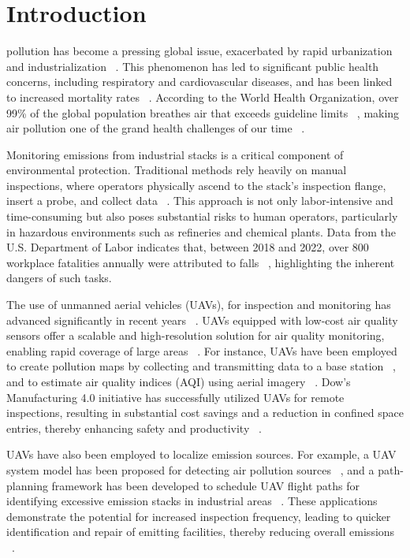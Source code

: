 \documentclass[lettersize,journal]{IEEEtran}
\begin{document}
\section{Introduction} \label{sec.intro}
 pollution has become a pressing global issue, exacerbated by rapid urbanization and industrialization ~\cite{barbera2010hyperbolic}. This phenomenon has led to significant public health concerns, including respiratory and cardiovascular diseases, and has been linked to increased mortality rates ~\cite{zarrar2023drive}. According to the World Health Organization, over 99\% of the global population breathes air that exceeds guideline limits ~\cite{WHO-poluted99}, making air pollution one of the grand health challenges of our time ~\cite{world2016ambient}.

Monitoring emissions from industrial stacks is a critical component of environmental protection. Traditional methods rely heavily on manual inspections, where operators physically ascend to the stack's inspection flange, insert a probe, and collect data ~\cite{testo350application}. This approach is not only labor-intensive and time-consuming but also poses substantial risks to human operators, particularly in hazardous environments such as refineries and chemical plants. Data from the U.S. Department of Labor indicates that, between 2018 and 2022, over 800 workplace fatalities annually were attributed to falls ~\cite{Injuries2022}, highlighting the inherent dangers of such tasks.

The use of unmanned aerial vehicles (UAVs), for inspection and monitoring has advanced significantly in recent years ~\cite{qiu2017low}. UAVs equipped with low-cost air quality sensors offer a scalable and high-resolution solution for air quality monitoring, enabling rapid coverage of large areas ~\cite{motlagh2023unmanned}. For instance, UAVs have been employed to create pollution maps by collecting and transmitting data to a base station ~\cite{alvear2017using}, and to estimate air quality indices (AQI) using aerial imagery ~\cite{gao2020aq360}. Dow’s Manufacturing 4.0 initiative has successfully utilized UAVs for remote inspections, resulting in substantial cost savings and a reduction in confined space entries, thereby enhancing safety and productivity ~\cite{kas2020using}.

UAVs have also been employed to localize emission sources. For example, a UAV system model has been proposed for detecting air pollution sources ~\cite{le2022efficient}, and a path-planning framework has been developed to schedule UAV flight paths for identifying excessive emission stacks in industrial areas ~\cite{wang2024efficient}. These applications demonstrate the potential for increased inspection frequency, leading to quicker identification and repair of emitting facilities, thereby reducing overall emissions ~\cite{rashid2020optimized}.
\end{document}
